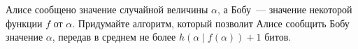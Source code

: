 Алисе сообщено значение случайной величины $\alpha$, а Бобу~--- значение некоторой функции $f$ от
$\alpha$. Придумайте алгоритм, который позволит Алисе сообщить Бобу значение $\alpha$, передав в среднем
не более $h(\alpha \mid f(\alpha)) + 1$ битов.